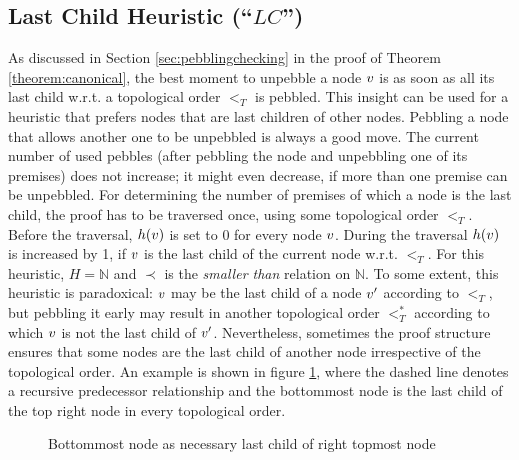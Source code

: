 \documentclass{llncs}
\begin{document}
\subsection{Last Child Heuristic (``$LC$'')}
\label{sec:lastchild}

As discussed in Section \ref{sec:pebblingchecking} in the proof of Theorem \ref{theorem:canonical}, the best moment to unpebble a node $v$ is as soon as all its last child w.r.t. a topological order $<_T$ is pebbled. 
This insight can be used for a heuristic that prefers nodes that are last children of other nodes. Pebbling a node that allows another one to be unpebbled is always a good move. 
The current number of used pebbles (after pebbling the node and unpebbling one of its premises) does not increase; 
it might even decrease, if more than one premise can be unpebbled.
For determining the number of premises of which a node is the last child, the proof has to be traversed once, using some topological order $<_T$.
Before the traversal, $h(v)$ is set to 0 for every node $v$. During the traversal $h(v)$ is increased by 1, if $v$ is the last child of the current node w.r.t. $<_T$. For this heuristic, $H = \mathbb{N}$ and $\prec$ is the \emph{smaller than} relation on $\mathbb{N}$.
To some extent, this heuristic is paradoxical: $v$ may be the last child of a node $v'$ according to $<_T$, but pebbling it early may result in another topological order $<^*_T$ according to which $v$ is not the last child of $v'$.
Nevertheless, sometimes the proof structure ensures that some nodes are the last child of another node irrespective of the topological order. An example is shown in figure \ref{fig:forcedLC}, where the dashed line denotes a recursive predecessor relationship and the bottommost node is the last child of the top right node in every topological order.

\begin{figure}[h]
	\caption{Bottommost node as necessary last child of right topmost node}
	\label{fig:forcedLC}
\end{figure}
\end{document}
